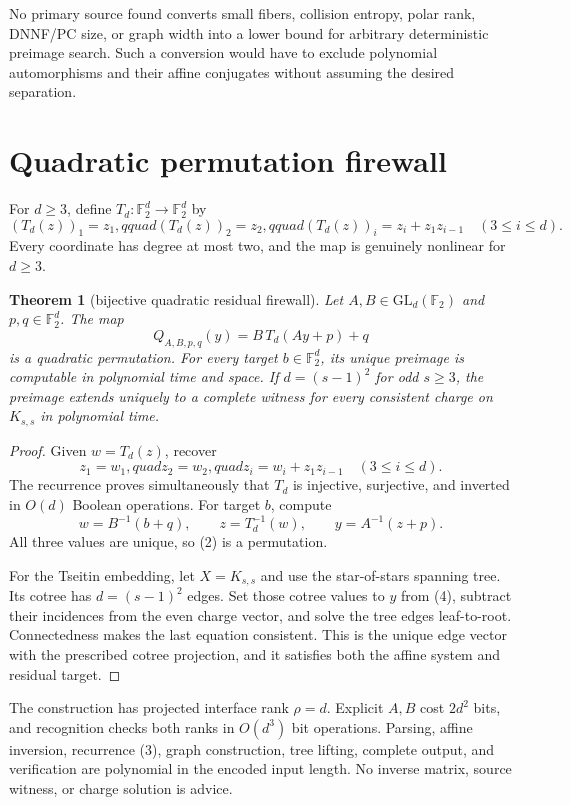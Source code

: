 \documentclass[11pt]{article}
\newtheorem{theorem}{Theorem}
\newcommand{\F}{\mathbb F_2}
\begin{document}
No primary source found converts small fibers, collision entropy, polar rank,
DNNF/PC size, or graph width into a lower bound for arbitrary deterministic
preimage search.  Such a conversion would have to exclude polynomial
automorphisms and their affine conjugates without assuming the desired
separation.

\section{Quadratic permutation firewall}
For $d\ge3$, define $T_d:\F^d\to\F^d$ by
\[
 (T_d(z))_1=z_1,qquad (T_d(z))_2=z_2,qquad
 (T_d(z))_i=z_i+z_1z_{i-1}\quad(3\le i\le d).            \tag{1}
\]
Every coordinate has degree at most two, and the map is genuinely nonlinear
for $d\ge3$.

\begin{theorem}[bijective quadratic residual firewall]
Let $A,B\in\mathrm{GL}_d(\F)$ and $p,q\in\F^d$.  The map
\[
 Q_{A,B,p,q}(y)=B\,T_d(Ay+p)+q                           \tag{2}
\]
is a quadratic permutation.  For every target $b\in\F^d$, its unique
preimage is computable in polynomial time and space.  If $d=(s-1)^2$ for odd
$s\ge3$, the preimage extends uniquely to a complete witness for every
consistent charge on $K_{s,s}$ in polynomial time.
\end{theorem}
\begin{proof}
Given $w=T_d(z)$, recover
\[
 z_1=w_1,quad z_2=w_2,quad
 z_i=w_i+z_1z_{i-1}\quad(3\le i\le d).                  \tag{3}
\]
The recurrence proves simultaneously that $T_d$ is injective, surjective,
and inverted in $O(d)$ Boolean operations.  For target $b$, compute
\[
 w=B^{-1}(b+q),\qquad z=T_d^{-1}(w),\qquad
 y=A^{-1}(z+p).                                         \tag{4}
\]
All three values are unique, so (2) is a permutation.

For the Tseitin embedding, let $X=K_{s,s}$ and use the star-of-stars spanning
tree.  Its cotree has $d=(s-1)^2$ edges.  Set those cotree values to $y$ from
(4), subtract their incidences from the even charge vector, and solve the tree
edges leaf-to-root.  Connectedness makes the last equation consistent.  This
is the unique edge vector with the prescribed cotree projection, and it
satisfies both the affine system and residual target.
\end{proof}

The construction has projected interface rank $\rho=d$.  Explicit $A,B$ cost
$2d^2$ bits, and recognition checks both ranks in $O(d^3)$ bit operations.
Parsing, affine inversion, recurrence (3), graph construction, tree lifting,
complete output, and verification are polynomial in the encoded input length.
No inverse matrix, source witness, or charge solution is advice.
\end{document}
